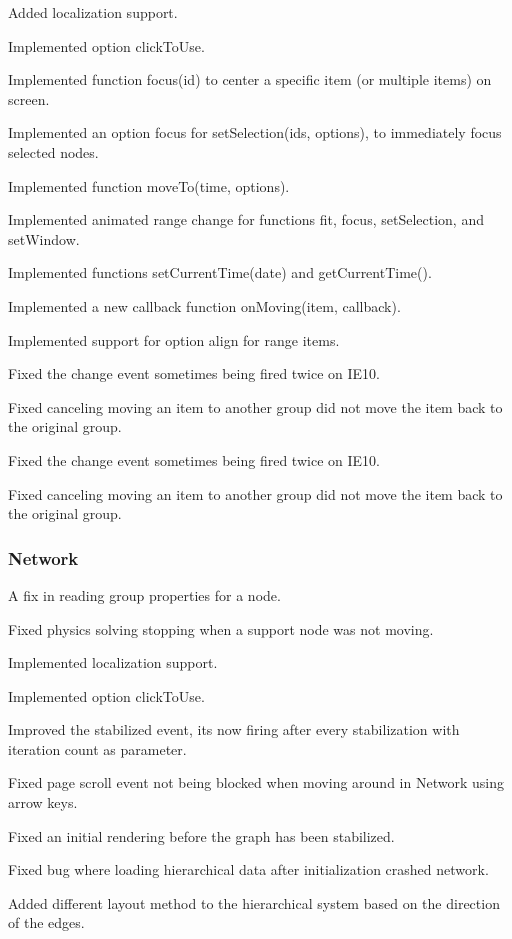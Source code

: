 \begin{DoxyItemize}
\item Added localization support.
\item Implemented option {\ttfamily click\+To\+Use}.
\item Implemented function {\ttfamily focus(id)} to center a specific item (or multiple items) on screen.
\item Implemented an option {\ttfamily focus} for {\ttfamily set\+Selection(ids, options)}, to immediately focus selected nodes.
\item Implemented function {\ttfamily move\+To(time, options)}.
\item Implemented animated range change for functions {\ttfamily fit}, {\ttfamily focus}, {\ttfamily set\+Selection}, and {\ttfamily set\+Window}.
\item Implemented functions {\ttfamily set\+Current\+Time(date)} and {\ttfamily get\+Current\+Time()}.
\item Implemented a new callback function {\ttfamily on\+Moving(item, callback)}.
\item Implemented support for option {\ttfamily align} for range items.
\item Fixed the {\ttfamily change} event sometimes being fired twice on I\+E10.
\item Fixed canceling moving an item to another group did not move the item back to the original group.
\item Fixed the {\ttfamily change} event sometimes being fired twice on I\+E10.
\item Fixed canceling moving an item to another group did not move the item back to the original group.
\end{DoxyItemize}

\subsubsection*{Network}


\begin{DoxyItemize}
\item A fix in reading group properties for a node.
\item Fixed physics solving stopping when a support node was not moving.
\item Implemented localization support.
\item Implemented option {\ttfamily click\+To\+Use}.
\item Improved the {\ttfamily stabilized} event, it\textquotesingle{}s now firing after every stabilization with iteration count as parameter.
\item Fixed page scroll event not being blocked when moving around in Network using arrow keys.
\item Fixed an initial rendering before the graph has been stabilized.
\item Fixed bug where loading hierarchical data after initialization crashed network.
\item Added different layout method to the hierarchical system based on the direction of the edges.
\end{DoxyItemize}

